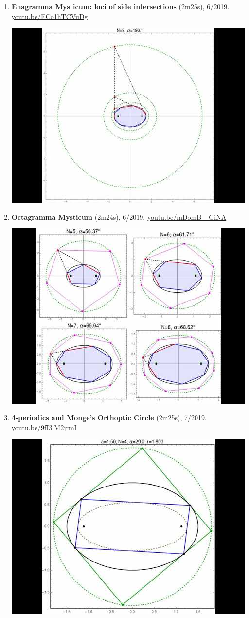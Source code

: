 \documentclass[12pt]{article}
\begin{document}
\begin{enumerate}[resume]
% 
\item \textbf{Enagramma Mysticum: loci of side intersections} (2m25s), 6/2019. \href{https://youtu.be/ECo1hTCVuDg}{\url{youtu.be/ECo1hTCVuDg}}
\begin{center}\includegraphics[width=.5\textwidth]{pics/ECo1hTCVuDg.jpg}\end{center}
% 
\item \textbf{Octagramma Mysticum} (2m24s), 6/2019. \href{https://youtu.be/mDomB-_GiNA}{\url{youtu.be/mDomB-\_GiNA}}
\begin{center}\includegraphics[width=.5\textwidth]{pics/mDomB-_GiNA.jpg}\end{center}
% 
\item \textbf{4-periodics and Monge's Orthoptic Circle} (2m25s), 7/2019. \href{https://youtu.be/9fI3iM2jrmI}{\url{youtu.be/9fI3iM2jrmI}}
\begin{center}\includegraphics[width=.5\textwidth]{pics/9fI3iM2jrmI.jpg}\end{center}

\end{enumerate}
\end{document}
